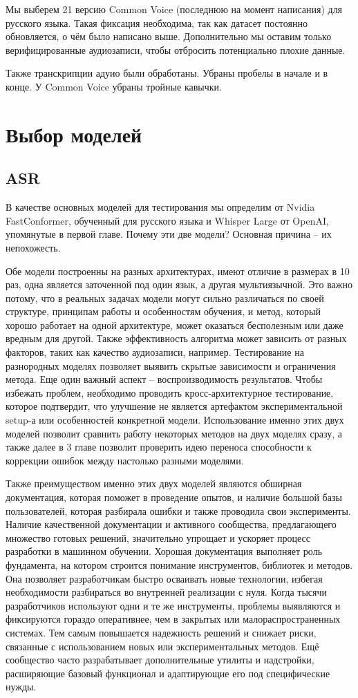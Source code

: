 Мы выберем 21 версию Common Voice (последнюю на момент написания) для русского языка.
Такая фиксация необходима, так как датасет постоянно обновляется, о чём было написано выше.
Дополнительно мы оставим только верифицированные аудиозаписи, чтобы отбросить потенциально плохие данные.

Также транскрипции адуио были обработаны.
Убраны пробелы в начале и в конце.
У Common Voice убраны тройные кавычки.

\section{Выбор моделей}
\subsection{ASR}

В качестве основных моделей для тестирования мы определим от Nvidia FastConformer, обученный для русского языка и Whisper Large от OpenAI, упомянутые в первой главе.
Почему эти две модели? Основная причина -- их непохожесть.

Обе модели построенны на разных архитектурах, имеют отличие в размерах в 10 раз, одна является заточенной под один язык, а другая мультиязычной.
Это важно потому, что в реальных задачах модели могут сильно различаться по своей структуре, принципам работы и особенностям обучения, и метод, который хорошо работает на одной архитектуре, может оказаться бесполезным или даже вредным для другой.
Также эффективность алгоритма может  зависить от разных факторов, таких как качество аудиозаписи, например.
Тестирование на разнородных моделях позволяет выявить скрытые зависимости и ограничения метода.
Еще один важный аспект -- воспроизводимость результатов.
Чтобы избежать проблем, необходимо проводить кросс-архитектурное тестирование, которое подтвердит, что улучшение не является артефактом экспериментальной setup-а или особенностей конкретной модели.
Использование именно этих двух моделей позволит сравнить работу некоторых методов на двух моделях сразу, а также далее в 3 главе позволит проверить идею переноса способности к коррекции ошибок между настолько разными моделями.

Также преимуществом именно этих двух моделей являются обширная документация, которая поможет в проведение опытов, и наличие большой базы пользователей, которая разбирала ошибки и также проводила свои эксперименты.
Наличие качественной документации и активного сообщества, предлагающего множество готовых решений, значительно упрощает и ускоряет процесс разработки в машинном обучении. Хорошая документация выполняет роль фундамента, на котором строится понимание инструментов, библиотек и методов. Она позволяет разработчикам быстро осваивать новые технологии, избегая необходимости разбираться во внутренней реализации с нуля.
Когда тысячи разработчиков используют одни и те же инструменты, проблемы выявляются и фиксируются гораздо оперативнее, чем в закрытых или малораспространенных системах.
Тем самым повышается надежность решений и снижает риски, связанные с использованием новых или экспериментальных методов.
Ещё сообщество часто разрабатывает дополнительные утилиты и надстройки, расширяющие базовый функционал и адаптирующие его под специфические нужды.

